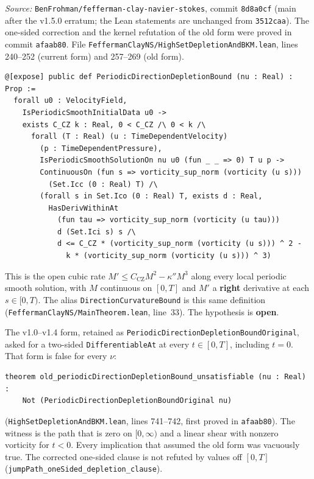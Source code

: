 \documentclass[11pt]{article}
\theoremstyle{plain}
\theoremstyle{definition}
\theoremstyle{remark}
\newcommand{\fefsha}{8d8a0cf}
\begin{document}
\textit{Source:} \texttt{BenFrohman/\hspace{0pt}fefferman-clay-navier-stokes}, commit \texttt{\fefsha} (main after the v1.5.0 erratum; the Lean statements are unchanged from \texttt{3512caa}). The one-sided correction and the kernel refutation of the old form were proved in commit \texttt{afaab80}. File \texttt{FeffermanClayNS/\hspace{0pt}HighSetDepletionAndBKM.\hspace{0pt}lean}, lines 240--252 (current form) and 257--269 (old form).
\begin{lstlisting}
@[expose] public def PeriodicDirectionDepletionBound (nu : Real) : Prop :=
  forall u0 : VelocityField,
    IsPeriodicSmoothInitialData u0 ->
    exists C_CZ k : Real, 0 < C_CZ /\ 0 < k /\
      forall (T : Real) (u : TimeDependentVelocity)
        (p : TimeDependentPressure),
        IsPeriodicSmoothSolutionOn nu u0 (fun _ _ => 0) T u p ->
        ContinuousOn (fun s => vorticity_sup_norm (vorticity (u s)))
          (Set.Icc (0 : Real) T) /\
        (forall s in Set.Ico (0 : Real) T, exists d : Real,
          HasDerivWithinAt
            (fun tau => vorticity_sup_norm (vorticity (u tau)))
            d (Set.Ici s) s /\
            d <= C_CZ * (vorticity_sup_norm (vorticity (u s))) ^ 2 -
              k * (vorticity_sup_norm (vorticity (u s))) ^ 3)
\end{lstlisting}
This is the open cubic rate \(M'\le C_{\mathrm{CZ}}M^{2}-\kappa''M^{3}\) along every local periodic smooth solution, with \(M\) continuous on \([0,T]\) and \(M'\) a \textbf{right} derivative at each \(s\in[0,T)\). The alias \texttt{DirectionCurvatureBound} is this same definition (\texttt{FeffermanClayNS/\hspace{0pt}MainTheorem.\hspace{0pt}lean}, line~33). The hypothesis is \textbf{open}.

The v1.0--v1.4 form, retained as \texttt{PeriodicDirectionDepletionBoundOriginal}, asked for a two-sided \texttt{DifferentiableAt} at every \(t\in[0,T]\), including \(t=0\). That form is false for every \(\nu\):
\begin{lstlisting}
theorem old_periodicDirectionDepletionBound_unsatisfiable (nu : Real) :
    Not (PeriodicDirectionDepletionBoundOriginal nu)
\end{lstlisting}
(\texttt{HighSetDepletionAndBKM.\hspace{0pt}lean}, lines 741--742, first proved in \texttt{afaab80}). The witness is the path that is zero on \([0,\infty)\) and a linear shear with nonzero vorticity for \(t<0\). Every implication that assumed the old form was vacuously true. The corrected one-sided clause is not refuted by values off \([0,T]\) (\texttt{jumpPath\_\hspace{0pt}oneSided\_\hspace{0pt}depletion\_\hspace{0pt}clause}).
\end{document}
